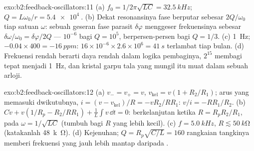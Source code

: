 \begin{solution}{exo:b2:feedback-oscillators:11}
(a) $f_0 = 1/2\pi\sqrt{LC} = \qty{32.5}{kHz}$; $Q = L\omega_0/r = \qty{5.4e4}{}$. (b) Dekat
resonansinya fase  berputar sebesar $2Q/\omega_0$ tiap satuan $\omega$: sebuah
geseran fase parasit $\delta\varphi$ menggeser frekuensinya sebesar $\delta\omega/\omega_0 =
\delta\varphi/2Q$ --- $10^{-6}$ bagi $Q = 10^5$, berpersen-persen bagi $Q = 1/3$. (c) \qty{1}{Hz};
$-0.04 \times 400 = \qty{-16}{ppm}$: $16 \times 10^{-6} \times 2.6 \times 10^6 = \qty{41}{s}$ terlambat tiap
bulan. (d) Frekuensi rendah berarti daya rendah dalam logika pembaginya, $2^{15}$
membagi tepat menjadi \qty{1}{Hz}, dan kristal garpu tala yang mungil itu muat dalam sebuah
arloji.
\end{solution}

\begin{solution}{exo:b2:feedback-oscillators:12}
(a) $v_- = v_+ = v$, $v_{\text{kel}} = v(1 + R_2/R_1)$; arus yang memasuki
dwikutubnya, $i = (v - v_{\text{kel}})/R = -vR_2/RR_1$: $v/i = -RR_1/R_2$. (b) $C\dot v +
v(1/R_p - R_2/RR_1) + \frac1L\int v\,\dd t = 0$: berkelanjutan ketika $R = R_pR_2/R_1$,
pada $\omega = 1/\sqrt{LC}$ (tumbuh bagi $R$ yang lebih kecil). (c) $f = \qty{5.0}{kHz}$, $R \lesssim
\qty{50}{k\ohm}$ (katakanlah \qty{48}{k\ohm}). (d) Kejenuhan; $Q = R_p
\sqrt{C/L} = 160$ rangkaian tangkinya memberi frekuensi yang jauh lebih mantap daripada .
\end{solution}

